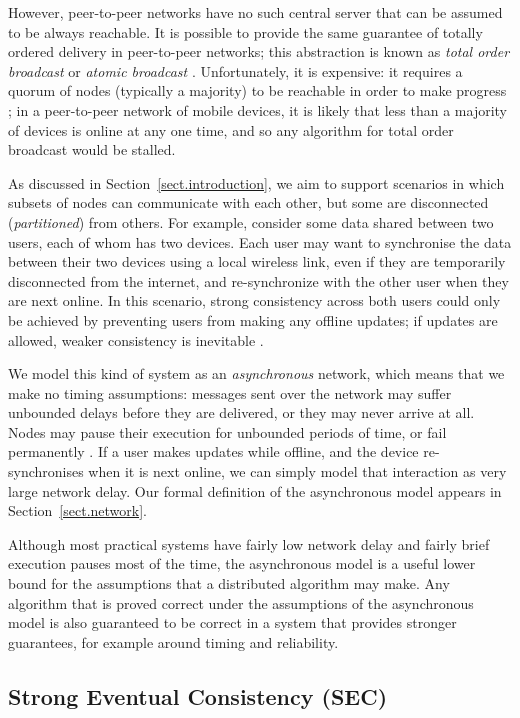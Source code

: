 However, peer-to-peer networks have no such central server that can be assumed to be always
reachable. It is possible to provide the same guarantee of totally ordered delivery in peer-to-peer
networks; this abstraction is known as \emph{total order broadcast} or \emph{atomic broadcast}
\cite{Cachin:2011wt,Defago:2004ji}. Unfortunately, it is expensive: it requires a quorum of nodes
(typically a majority) to be reachable in order to make progress \cite{Chandra:1996cp}; in a
peer-to-peer network of mobile devices, it is likely that less than a majority of devices is online
at any one time, and so any algorithm for total order broadcast would be stalled.

As discussed in Section~\ref{sect.introduction}, we aim to support scenarios in which subsets of
nodes can communicate with each other, but some are disconnected (\emph{partitioned}) from others.
For example, consider some data shared between two users, each of whom has two devices. Each user
may want to synchronise the data between their two devices using a local wireless link, even if they
are temporarily disconnected from the internet, and re-synchronize with the other user when they are
next online. In this scenario, strong consistency across both users could only be achieved by
preventing users from making any offline updates; if updates are allowed, weaker consistency is
inevitable \cite{Attiya:2015dm,Davidson:1985hv}.

We model this kind of system as an \emph{asynchronous} network, which means that we make no timing
assumptions: messages sent over the network may suffer unbounded delays before they are delivered,
or they may never arrive at all. Nodes may pause their execution for unbounded periods of time, or
fail permanently \cite{Cachin:2011wt}. If a user makes updates while offline, and the device
re-synchronises when it is next online, we can simply model that interaction as very large network
delay. Our formal definition of the asynchronous model appears in Section~\ref{sect.network}.

Although most practical systems have fairly low network delay and fairly brief execution pauses most
of the time, the asynchronous model is a useful lower bound for the assumptions that a distributed
algorithm may make. Any algorithm that is proved correct under the assumptions of the asynchronous
model is also guaranteed to be correct in a system that provides stronger guarantees, for example
around timing and reliability.

\subsection{Strong Eventual Consistency (SEC)}\label{sect.eventual.consistency}


